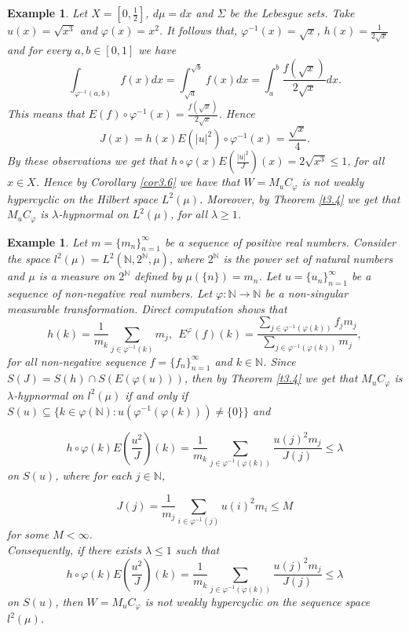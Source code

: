 \documentclass{amsart}
\newtheorem{exam}[thm]{Example}
\theoremstyle{definition}\newtheorem{defn}[thm]{Definition}
\theoremstyle{remark}
\numberwithin{equation}{section}
\begin{document}
\begin{exam} Let $X=[0, \frac{1}{2}]$, $d\mu=dx$ and $\Sigma$
be the Lebesgue sets. Take $u(x)=\sqrt{x^3}$ and $\varphi(x)=x^2$. 
 It follows that, $\varphi^{-1}(x)=\sqrt{x}$, $h(x)=\frac{1}{2\sqrt{x}}$ and for every $a,b\in [0,1]$ we have 
 $$\int_{\varphi^{-1}(a,b)}f(x)dx=\int_{\sqrt{a}}^{\sqrt{b}}f(x)dx=\int_{a}^{b}\frac{f(\sqrt{x})}{2\sqrt{x}}dx.$$
 This means that $E(f)\circ\varphi^{-1}(x)=\frac{f(\sqrt{x})}{2\sqrt{x}}$. Hence 
 $$J(x)=h(x)E(|u|^2)\circ\varphi^{-1}(x)=\frac{\sqrt{x}}{4}.$$
 By these observations we get that $h\circ \varphi(x) E(\frac{|u|^2}{J})(x)=2\sqrt{x^3}\leq 1$, for all $x\in X$. Hence by Corollary \ref{cor3.6} we have that $W=M_uC_{\varphi}$ is not weakly hypercyclic on the Hilbert space $L^2(\mu)$. Moreover, by Theorem \ref{t3.4} we get that $M_uC_{\varphi}$ is $\lambda$-hypnormal on $L^2(\mu)$, for all $\lambda\geq 1$.
 
 
\end{exam}

\begin{exam}
Let $m=\{m_n\}^{\infty}_{n=1}$ 
be a sequence of positive real numbers.
Consider the space $l^2(\mu)=L^2(\mathbb{N},2^{\mathbb{N}}, \mu)$, where $2^{\mathbb{N}}$ is the power set of natural
numbers and $\mu$ is a measure on $2^{\mathbb{N}}$ defined by $\mu(\{n\})=m_n$. Let $u=\{u_n\}^{\infty}_{n=1}$ be a sequence of non-negative real numbers. Let $\varphi:\mathbb{N}\rightarrow \mathbb{N}$ be a non-singular
measurable transformation. Direct computation shows that
$$h(k)=\frac{1}{m_k}\sum_{j\in \varphi^{-1}(k)}m_j, \ \  E^{\varphi}(f)(k)=\frac{\sum_{j\in \varphi^{-1}(\varphi(k))}f_jm_j}{\sum_{j\in \varphi^{-1}(\varphi(k))}m_j},$$
for all non-negative sequence $f=\{f_n\}^{\infty}_{n=1}$ and $k\in \mathbb{N}$. Since $S(J)=S(h)\cap S(E(\varphi(u)))$, then by Theorem \ref{t3.4} we get that $M_uC_{\varphi}$ is $\lambda$-hypnormal on $l^2(\mu)$ if and only if
$S(u)\subseteq \{k\in \varphi(\mathbb{N}):u(\varphi^{-1}(\varphi(k)))\neq\{0\}\}$ and

$$h\circ\varphi(k)E(\frac{u^2}{J})(k)=\frac{1}{m_k}\sum_{j\in \varphi^{-1}(\varphi(k))}\frac{u(j)^2m_j}{J(j)}\leq \lambda$$
on $S(u)$, where for each $j\in \mathbb{N}$,

$$J(j)=\frac{1}{m_j}\sum_{i\in \varphi^{-1}(j)}u(i)^2m_i\leq M$$
for some $M<\infty$.\\
Consequently, if there exists $\lambda\leq 1$ such that 
$$h\circ\varphi(k)E(\frac{u^2}{J})(k)=\frac{1}{m_k}\sum_{j\in \varphi^{-1}(\varphi(k))}\frac{u(j)^2m_j}{J(j)}\leq \lambda$$
on $S(u)$, then $W=M_uC_{\varphi}$ is not weakly hypercyclic on the sequence space $l^2(\mu)$.
 
 
\end{exam}
\end{document}
